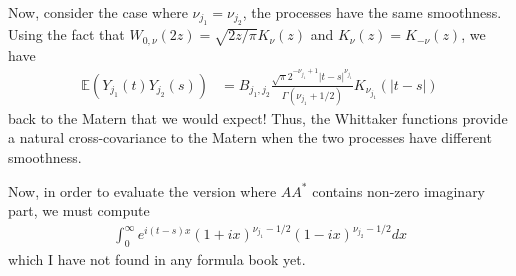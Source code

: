 \documentclass[11pt]{article}
\begin{document}
Now, consider the case where $\nu_{j_1} = \nu_{j_2}$, the processes have the same smoothness. Using the fact that $W_{0, \nu}(2z) = \sqrt{2z/\pi} K_\nu(z)$ and $K_\nu(z) = K_{-\nu}(z)$, we have \begin{align*}
\mathbb{E}(Y_{j_1}(t)Y_{j_2}(s)) &=B_{j_1, j_2} \frac{\sqrt{\pi} 2^{-\nu_{j_1} +1} |t-s|^{\nu_{j_1}}}{\Gamma(\nu_{j_1} + 1/2)} K_{\nu_{j_1}}(|t-s|)
\end{align*}back to the Matern that we would expect! Thus, the Whittaker functions provide a natural cross-covariance to the Matern when the two processes have different smoothness.


Now, in order to evaluate the version where $AA^*$ contains non-zero imaginary part, we must compute \begin{align*}
\int_0^\infty e^{i(t-s)x} (1 + ix)^{\nu_{j_1} - 1/2}(1 - ix)^{\nu_{j_2} - 1/2} dx
\end{align*}which I have not found in any formula book yet.



% 


\end{document}
